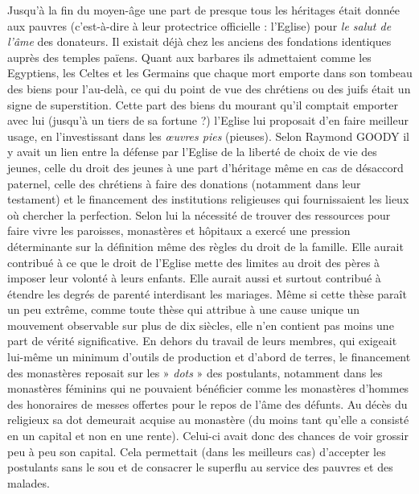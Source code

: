  Jusqu'à la fin du moyen-âge une part de presque tous les héritages était donnée aux pauvres (c'est-à-dire à leur protectrice officielle : l'Eglise) pour \emph{le salut de l'âme} des donateurs. Il existait déjà chez les anciens des fondations identiques auprès des temples païens. Quant aux barbares ils admettaient comme les Egyptiens, les Celtes et les Germains que chaque mort emporte dans son tombeau des biens pour l'au-delà, ce qui du point de vue des chrétiens ou des juifs était un signe de superstition. Cette part des biens du mourant qu'il comptait emporter avec lui (jusqu'à un tiers de sa fortune ?) l'Eglise lui proposait d'en faire meilleur usage, en l'investissant dans les \emph{œuvres pies} (pieuses). 
 Selon Raymond GOODY il y avait un lien entre la défense par l'Eglise de la liberté de choix de vie des jeunes, celle du droit des jeunes à une part d'héritage même en cas de désaccord paternel, celle des chrétiens à faire des donations (notamment dans leur testament) et le financement des institutions religieuses qui fournissaient les lieux où chercher la perfection. Selon lui la nécessité de trouver des ressources pour faire vivre les paroisses, monastères et hôpitaux a exercé une pression déterminante sur la définition même des règles du droit de la famille. Elle aurait contribué à ce que le droit de l'Eglise mette des limites au droit des pères à imposer leur volonté à leurs enfants. Elle aurait aussi et surtout contribué à étendre les degrés de parenté interdisant les mariages. Même si cette thèse paraît un peu extrême, comme toute thèse qui attribue à une cause unique un mouvement observable sur plus de dix siècles, elle n'en contient pas moins une part de vérité significative. 
 En dehors du travail de leurs membres, qui exigeait lui-même un minimum d'outils de production et d'abord de terres, le financement des monastères reposait sur les » \emph{dots} » des postulants, notamment dans les monastères féminins qui ne pouvaient bénéficier comme les monastères d'hommes des honoraires de messes offertes pour le repos de l'âme des défunts. Au décès du religieux sa dot demeurait acquise au monastère (du moins tant qu'elle a consisté en un capital et non en une rente). Celui-ci avait donc des chances de voir grossir peu à peu son capital. Cela permettait (dans les meilleurs cas) d'accepter les postulants sans le sou et de consacrer le superflu au service des pauvres et des malades.
 
